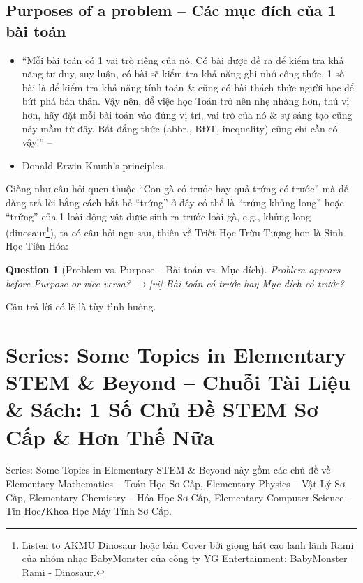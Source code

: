 \documentclass[12pt,oneside]{book}
\newtheorem{question}{Question}
\begin{document}
\subsection{Purposes of a problem -- Các mục đích của 1 bài toán}

\begin{itemize}
	\item ``Mỗi bài toán có 1 vai trò riêng của nó. Có bài được đề ra để kiểm tra khả năng tư duy, suy luận, có bài sẽ kiểm tra khả năng ghi nhớ công thức, 1 số bài là để kiểm tra khả năng tính toán \& cũng có bài thách thức người học để bứt phá bản thân. Vậy nên, để việc học Toán trở nên nhẹ nhàng hơn, thú vị hơn, hãy đặt mỗi bài toán vào đúng vị trí, vai trò của nó \& sự sáng tạo cũng nảy mầm từ đây. Bất đẳng thức (abbr., BĐT, inequality) cũng chỉ cần có vậy!'' -- \cite[Lời nói đầu, p. 3]{Anh_Quang_bdt_lem}
	\item {\sc Donald Erwin Knuth}'s principles.
\end{itemize}
Giống như câu hỏi quen thuộc ``Con gà có trước hay quả trứng có trước'' mà dễ dàng trả lời bằng cách bắt bẻ ``trứng'' ở đây có thể là ``trứng khủng long'' hoặc ``trứng'' của 1 loài động vật được sinh ra trước loài gà, e.g., khủng long (dinosaur\footnote{Listen to \href{https://www.youtube.com/watch?v=8Oz7DG76ibY}{AKMU Dinosaur} hoặc bản Cover bởi giọng hát cao lanh lãnh {\sc Rami} của nhóm nhạc {\sc BabyMonster} của công ty YG Entertainment: \href{https://www.youtube.com/watch?v=ZBXTKTeaJcA}{{\sc BabyMonster Rami} - Dinosaur}.}), ta có câu hỏi ngu sau, thiên về Triết Học Trừu Tượng hơn là Sinh Học Tiến Hóa:

\begin{question}[Problem vs. Purpose -- Bài toán vs. Mục đích]
	Problem appears before Purpose or vice versa? {\sf[en]$\to$[vi]} Bài toán có trước hay Mục đích có trước?
\end{question}
Câu trả lời có lẽ là tùy tình huống. 


\section{Series: Some Topics in Elementary STEM \& Beyond -- Chuỗi Tài Liệu \& Sách: 1 Số Chủ Đề STEM Sơ Cấp \& Hơn Thế Nữa}
Series: Some Topics in Elementary STEM \& Beyond này gồm các chủ đề về Elementary Mathematics -- Toán Học Sơ Cấp, Elementary Physics -- Vật Lý Sơ Cấp, Elementary Chemistry -- Hóa Học Sơ Cấp, Elementary Computer Science -- Tin Học{\tt/}Khoa Học Máy Tính Sơ Cấp.
\end{document}
